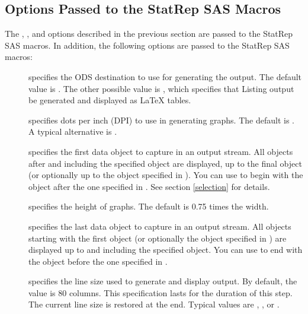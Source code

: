 \documentclass[article,oneside]{memoir}
\newcommand*{\StatRep}{\textsf{StatRep}\xspace}
\begin{document}
  \subsection{Options Passed to the  \textsf{StatRep} SAS Macros}\label{sasopts}
The , , and  options described in the previous
section are passed to the \StatRep SAS macros.
In addition, the following options are passed to the \StatRep SAS macros:
  \begin{description}

  \item[] specifies the ODS destination to use for generating the output.
     The default value is . The other possible value is , which
     specifies that Listing output be generated and displayed as LaTeX tables.

    \item[] specifies dots per inch (DPI) to use in generating graphs.
  The default is . A typical alternative is .

  \item[] specifies the first data object to capture in an output stream.
  All objects after and including the specified object
  are displayed, up to the final object
 (or optionally up to the object specified in ).
  You can use  to begin with the object after the one specified in .
  See section \ref{selection} for details.

  \item[] specifies the height of graphs. The default is 0.75 times the width.

  \item[] specifies the last data object to capture in an output stream.
  All objects starting with the first object
  (or optionally the object specified in ) are displayed up to and
  including the specified object.
  You can use  to end with the object before the one specified in .

\item[] specifies the line size used to generate and display
      output. By default, the value is 80 columns.
     This specification lasts for the duration of this step. The current line size is
     restored at the end.
     Typical values are , , or .


\end{description}
\end{document}
